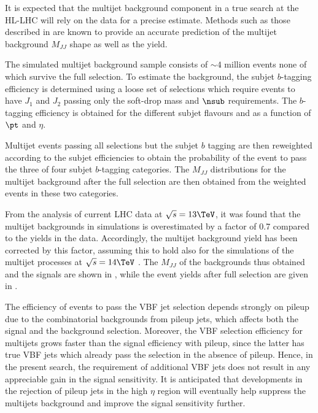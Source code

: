 It is expected that the multijet background component in a true search at the HL-LHC will rely on the data for a precise estimate. Methods such as those described in  are known to provide an accurate prediction of the multijet background $M_{JJ}$ shape as well as the yield. 

The simulated multijet background sample consists of $\sim\!4$ million events none of which survive the full selection. To estimate the background, the subjet $ b $-tagging efficiency is determined using a loose set of selections which require events to have $J_{1}$ and $J_{2}$ passing only the soft-drop mass and $\nsub$ requirements. The $ b $-tagging efficiency is obtained for the different subjet flavours and as a function of $\pt$ and $\eta$. 

Multijet events passing all selections but the subjet $ b $ tagging are then reweighted according to the subjet efficiencies to obtain the probability of the event to pass the three of four subjet $ b $-tagging categories. The $M_{JJ}$ distributions for the multijet background after the full selection are then obtained from the weighted events in these two categories. 

From the analysis of current LHC data at $\sqrt{s} = 13\TeV$, it was found that the multijet backgrounds in simulations is overestimated by a factor of 0.7 compared to the yields in the data.  Accordingly, the multijet background yield has been corrected by this factor, assuming this to hold also for the simulations of the multijet processes at $\sqrt{s} = 14\TeV$ .
The $M_{JJ}$ of the backgrounds thus obtained and the signals are shown in , while the event yields after full selection are given in . 

The efficiency of events to pass the VBF jet selection depends strongly on pileup due to the combinatorial backgrounds from pileup jets, which affects both the signal and the background selection. Moreover, the VBF selection efficiency for multijets grows faster than the signal efficiency with pileup, since the latter has true VBF jets which already pass the selection in the absence of pileup. Hence, in the present search, the requirement of additional VBF jets does not result in any appreciable gain in the signal sensitivity. It is anticipated that developments in the rejection of pileup jets in the high $\eta$ region will eventually help suppress the multijets background and improve the signal sensitivity further.

